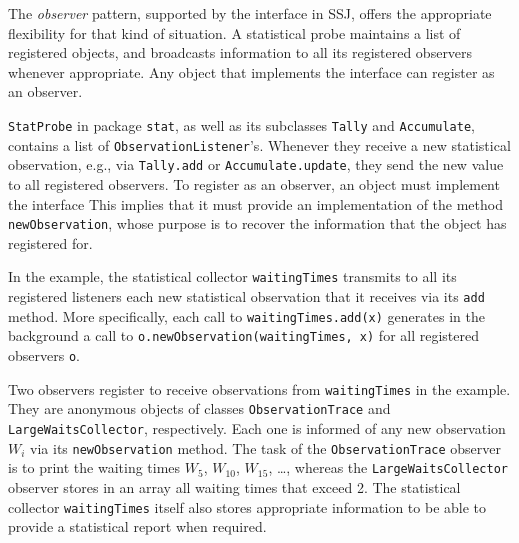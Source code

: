 \iffalse
The \emph{observer} pattern, supported by the \texttt{Observable}
class and \texttt{Observer} interface in Java,
offers the appropriate flexibility for that kind of situation.
An \texttt{Observable} object acts in a sense like a \emph{broadcasting}
\emph{distribution agency} that maintains a list of registered
\texttt{Observer} objects, and sends information to all its registered
observers whenever appropriate.
\fi

The \emph{observer} pattern, supported by the
 interface in SSJ,
offers the appropriate flexibility for that kind of situation.
A statistical probe maintains a list of registered
objects, and broadcasts information to all its registered
observers whenever appropriate. Any object that implements the interface
can register as an observer.

\texttt{StatProbe} in package \texttt{stat}, as well as its subclasses
\texttt{Tally} and \texttt{Accumulate}, contains a list of
 \texttt{ObservationListener}'s.
Whenever they receive a new statistical observation, e.g.,  via
\texttt{Tally.add} or \texttt{Accumulate.update}, they send the new value
to all registered observers.
To register as an observer, an object must implement the interface
This implies that it must provide an implementation of the method
\texttt{newObservation}, whose purpose is to recover the information
that the object has registered for.

In the example, the statistical collector \texttt{waitingTimes}
 transmits to all its registered
listeners each new statistical observation that it receives via
its \texttt{add} method.
More specifically, each call to \texttt{waitingTimes.add(x)} generates
in the background a call to \texttt{o.newObservation(waitingTimes, x)}
for all registered observers \texttt{o}.

\begin{comment}
The method \texttt{notifyObs} is used to
turn the tally into such an agency.  In fact, the collector is both a
tally and a distribution agency, but its tally functionality can be
disabled using the \texttt{stopCollectStat} method.  This can be useful when
the registered observers already perform statistical collection.
\end{comment}

Two observers register to receive observations from
\texttt{waitingTimes} in the example.
They are anonymous objects of classes \texttt{ObservationTrace} and
\texttt{LargeWaitsCollector}, respectively. Each one is informed of any new
observation $W_i$ via its \texttt{newObservation} method.
The task of the \texttt{ObservationTrace} observer is to
print the waiting times $W_5$, $W_{10}$, $W_{15}$, \dots, whereas
the \texttt{LargeWaitsCollector} observer stores in an array all waiting
times that exceed 2.
The statistical collector \texttt{waitingTimes} itself also stores
appropriate information to be able to provide a statistical report
when required.

